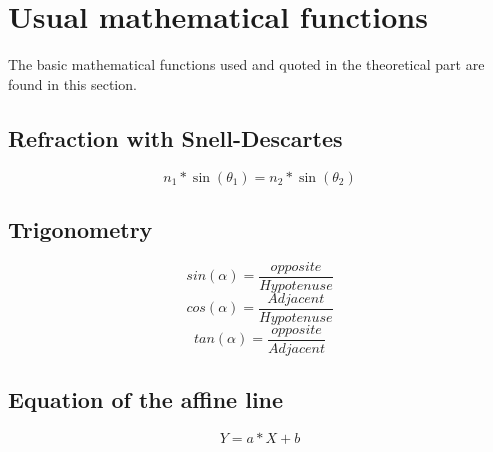 \section{Usual mathematical functions}
The basic mathematical functions used and quoted in the theoretical part are found in this section.
\subsection{Refraction with Snell-Descartes}
\begin{equation}\label{eq:Snell}
      n_1*\sin(\theta_1)=n_2*\sin(\theta_2)
\end{equation}
\subsection{Trigonometry}
\begin{equation}\label{eq:Trigo_sin}
      sin(\alpha) = \frac{opposite}{Hypotenuse}
\end{equation}
\begin{equation}\label{eq:Trigo_cos}
      cos(\alpha) = \frac{Adjacent}{Hypotenuse}
\end{equation}
\begin{equation}\label{eq:Trigo_tan}
      tan(\alpha) = \frac{opposite}{Adjacent}
\end{equation}
\subsection{Equation of the affine line}
\begin{equation}\label{eq:DoiteAffine}
      Y = a*X+b
\end{equation}
